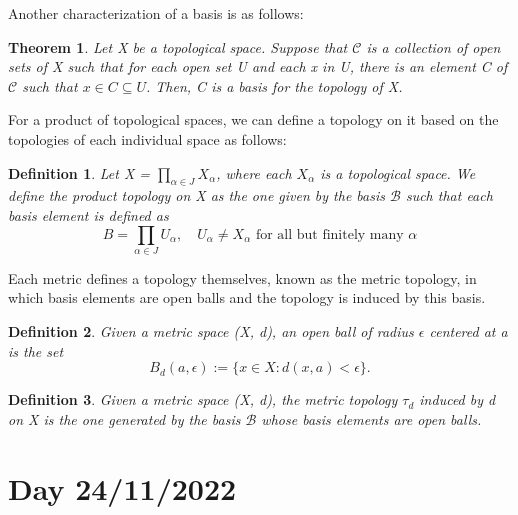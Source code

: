 \documentclass{article}
\newtheorem*{def*}{Definition}
\newtheorem*{theo*}{Theorem}
\begin{document}
Another characterization of a basis is as follows:
\begin{theo*}
  Let X be a topological space. Suppose that $\mathcal{C}$ is a collection of open sets of X such that for each open set
U and each x in U, there is an element C of $\mathcal{C}$ such that $x\in{C}\subseteq{U}$. Then, C is a basis for the topology 
of X.
\end{theo*}

For a product of topological spaces, we can define a topology on it based on the topologies of each individual space as follows:
\begin{def*}
  Let X = $\prod\limits _{\alpha\in{J}} X _{\alpha}$, where each $X _{\alpha}$ is a topological space. We define the product
topology on X as the one given by the basis $\mathcal{B}$ such that each basis element is defined as
  $$
  B = \prod _{\alpha\in{J}} U _{\alpha}, \quad U _{\alpha}\neq{X _{\alpha}} \text{ for all but finitely many }\alpha
  $$
\end{def*}

Each metric defines a topology themselves, known as the metric topology, in which basis elements are open balls and
the topology is induced by this basis.
\begin{def*}
  Given a metric space (X, d), an open ball of radius $\epsilon$ centered at a is the set
  $$
  B_d(a, \epsilon) := \{x\in{X}: d(x, a) < \epsilon\}.
  $$
\end{def*}
\begin{def*}
  Given a metric space (X, d), the metric topology $\tau_d$ induced by d on X is the one generated by the basis
 $\mathcal{B}$ whose basis elements are open balls.
\end{def*}

\section{Day 24/11/2022}
\end{document}
